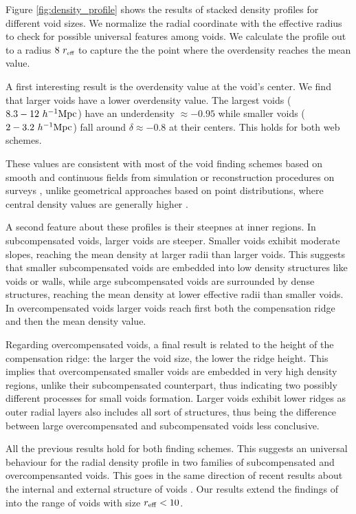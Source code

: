 \documentclass[a4,useAMS,usenatbib,usegraphicx]{mn2e}
\newcommand{\hMpc}{{\ifmmode{h^{-1}{\rm Mpc}}\else{$h^{-1}$Mpc}\fi}}
\newcommand{\reff}{{\ifmmode{r_{\mbox{\tiny eff}}}\else{$r_{\mbox{\tiny eff}}$}\fi}}
\begin{document}
Figure \ref{fig:density_profile} shows the results of stacked density
profiles for different void sizes.  
We normalize the radial coordinate with the effective radius to check
for possible universal features among voids. 
We calculate the profile out to a radius $8\ \reff$  to capture the
the point where the overdensity reaches the mean value.


A first interesting result is the overdensity value at the void's
center.
We find that larger voids have a lower overdensity value.
The largest voids ($8.3-12\ \hMpc$) have an underdensity
$\approx-0.95$ while smaller voids  ($2-3.2\ \hMpc$) fall around $\delta\approx 
-0.8$ at their centers.
This holds for both web schemes. 

These values are consistent with most of the void finding schemes
based on smooth and continuous fields from simulation or
reconstruction procedures on surveys \citep{Plionis02, Colberg05,
  Shandarin06,  Platen07, Neyrinck08, MunozCuartas11, Neyrinck13,
  Ricciardelli2013}, unlike geometrical approaches based on point
distributions, where central density values are generally higher
\citep{Colberg08}. 


A second feature about these profiles is their steepnes at inner
regions.  
In subcompensated voids, larger voids are steeper.
Smaller voids exhibit moderate slopes, reaching the mean density at
larger radii than larger voids.
This suggests that smaller subcompensated voids are embedded into low
density structures like voids or walls, while arge subcompensated
voids are surrounded  by dense structures, reaching the mean density
at lower effective radii than smaller voids.
In overcompensated voids larger voids reach first  both the
compensation ridge and then the mean density value.  


Regarding overcompensated voids, a final result is related to the height 
of the compensation ridge: the larger the void size, the lower the ridge
height. This implies that overcompensated smaller voids are embedded in 
very high density regions, unlike their subcompensated counterpart, thus 
indicating two possibly different processes for small voids formation. 
Larger voids exhibit lower ridges as outer radial layers also includes all
sort of structures, thus being the difference between large overcompensated
and subcompensated voids less conclusive.

All the previous results hold for both finding schemes.
This suggests an universal behaviour for the radial density profile in
two families of subcompensated and overcompensanted voids. 
This goes in the same direction of recent results about the internal
\citep{Colberg05,  Ricciardelli2013} and external structure of voids
\citep{Lavaux12, Hamaus14}. 
Our results extend the findings of \cite{Hamaus14} into the range of
voids with size $r_{\rm eff}<10$\hMpc. 
\end{document}
